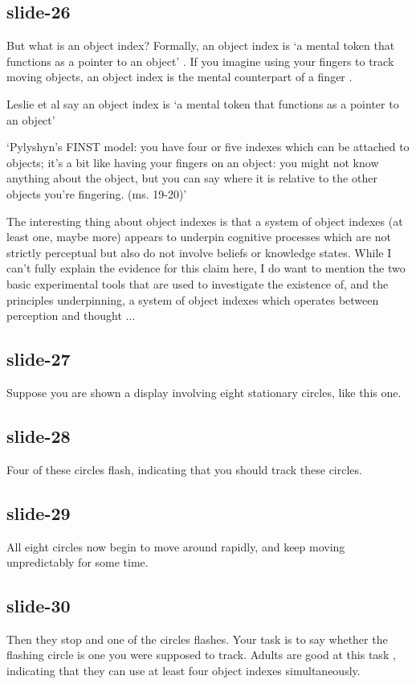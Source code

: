 \documentclass[12pt,\papersize]{extarticle}
\begin{document}
\subsection{slide-26}
But what is an object index?
Formally, an object index is ‘a mental token that functions as a
pointer to an object’ \citep[p.\ 11]{Leslie:1998zk}.
If you imagine using your fingers to track moving objects,
an object index is the mental counterpart of a finger \citep[p.~68]{pylyshyn:1989_role}.

Leslie et al say an object index is ‘a mental token that functions as a pointer to an
object’ \citep[p.\ 11]{Leslie:1998zk}

‘Pylyshyn’s FINST model: you have four or five indexes which can be attached to objects;
it’s a bit like having your fingers on an object: you might not know anything about the
object, but you can say where it is relative to the other objects you’re fingering.
(ms. 19-20)’ \citep{Scholl:1999mi}

The interesting thing about object indexes is that a system of object
indexes (at least one, maybe more)
appears to underpin cognitive processes which are not
strictly perceptual but also do not involve beliefs or knowledge states.
While I can’t fully explain the evidence for this claim here,
I do want to mention the two basic experimental tools that are used to
investigate the existence of, and the principles underpinning,
a system of object indexes which operates
between perception and thought ...

\subsection{slide-27}
Suppose you are shown a display involving eight stationary circles, like
this one.

\subsection{slide-28}
Four of these circles flash, indicating that you should track these circles.

\subsection{slide-29}
All eight circles now begin to move around rapidly, and keep moving unpredictably for some time.

\subsection{slide-30}
Then they stop and one of the circles flashes.
Your task is to say whether the flashing circle is one you were supposed to track.
Adults are good at this task \citep{pylyshyn:1988_tracking}, indicating that they can use at least four object indexes simultaneously.
\end{document}
